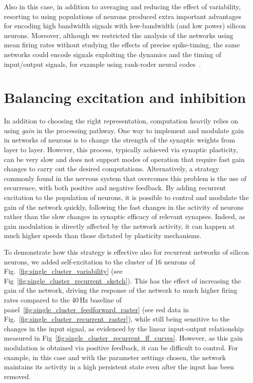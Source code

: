 Also in this case, in addition to averaging and reducing the effect of variability, resorting to using populations of neurons produced extra important advantages for encoding high bandwidth signals with low-bandwidth (and low power) silicon neurons. Moreover, although we restricted the analysis of the networks using mean firing rates without studying the effects of precise spike-timing, the same networks could encode signals exploiting the dynamics and the timing of input/output signals, for example using rank-roder neural codes~\cite{Furber_etal07}.


\section{Balancing excitation and inhibition}

In addition to choosing the right representation, computation heavily relies on using \emph{gain} in the processing pathway.
One way to implement and modulate gain in networks of neurons is to change the strength of the synaptic weights from layer to layer.
However, this process, typically achieved via synaptic plasticity, can be very slow and does not support modes of operation that require fast gain changes to carry out the desired computations.
Alternatively, a strategy commonly found in the nervous system that overcomes this problem is the use of recurrence, with both positive and negative feedback.
By adding recurrent excitation to the population of neurons, it is possible to control and modulate the gain of the network quickly, following the fast changes in the activity of neurons rather than the slow changes in synaptic efficacy of relevant synapses.
Indeed, as gain modulation is directly affected by the network activity, it can happen at much higher speeds than those dictated by plasticity mechanisms.


To demonstrate how this strategy is effective also for recurrent networks of silicon neurons, we added self-excitation to the cluster of 16 neurons of Fig.~\ref{fig:single_cluster_variability} (see Fig~\ref{fig:single_cluster_recurrent_sketch}).
This has the effect of increasing the gain of the network, driving the response of the network to much higher firing rates compared to the 40\,Hz baseline of panel~\ref{fig:single_cluster_feedforward_raster} (see red data in Fig.~\ref{fig:single_cluster_recurrent_raster}), while still being sensitive to the changes in the input signal, as evidenced by the linear input-output relationship measured in Fig~\ref{fig:single_cluster_recurrent_ff_curves}.
However, as this gain modulation is obtained via positive feedback, it can be difficult to control.
For example, in this case and with the parameter settings chosen, the network maintains its activity in a high persistent state even after the input has been removed.

